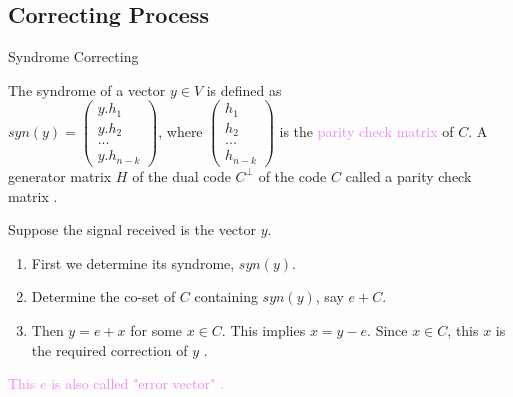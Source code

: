 \documentclass{beamer}
\begin{document}
\subsection{Correcting Process}
\begin{frame}{Syndrome Correcting}
  \begin{definition}
  The syndrome of a vector \(y \in V\) is defined as \\ \(syn(y)=\begin{pmatrix}
    y.h_1\\
    y.h_2\\
    ...\\
    y.h_{n-k}
  \end{pmatrix}\), \hspace{12mm} where \(\begin{pmatrix}
    h_1 \\ h_2\\ ...\\ h_{n-k}
  \end{pmatrix}\) is the \textcolor{violet}{parity check matrix} of \(C\). {\footnotesize A generator matrix \(H\) of the dual code \(C^{\perp}\) of the code \(C\) called a parity check matrix \cite{error_correct}}.
 \end{definition}
 \begin{tcolorbox}[colback=white, colframe=brown!80!black, boxsep=0mm, title={Correcting Process}]
 Suppose the signal received is the vector \(y\).
\begin{enumerate}
\item First we determine its syndrome, \(syn(y)\).
\item Determine the co-set of \(C\) containing \(syn(y)\), say \(e + C\).
\item Then \(y=e+x\) for some \(x \in C\). This implies \(x=y-e\). Since \(x \in C\), this \(x\) is the required correction of \(y\) \cite{error_correct}.
\end{enumerate}
\end{tcolorbox}
\textcolor{violet}{This \(e\) is also called "error vector" \cite{error_correct}.}

\end{frame}
\end{document}
